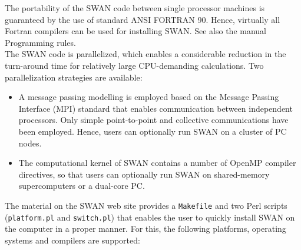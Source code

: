 \documentclass[12pt]{book}
\begin{document}
 \label{ch:instal}

The portability of the SWAN code between single processor machines is guaranteed by the use of standard ANSI
FORTRAN 90. Hence, virtually all Fortran compilers can be used for installing SWAN. See also the manual Programming rules.
\\[2ex]
\noindent
The SWAN code is parallelized, which enables a considerable reduction in the turn-around time for relatively
large CPU-demanding calculations. Two parallelization strategies are available:
\begin{itemize}
  \item A message passing modelling is employed based on the Message Passing Interface (MPI) standard that
        enables communication between independent processors. Only simple point-to-point and collective
        communications have been employed. Hence, users can optionally run SWAN on a cluster of PC nodes.
  \item The computational kernel of SWAN contains a number of OpenMP compiler directives, so that users can
        optionally run SWAN on shared-memory supercomputers or a dual-core PC.
\end{itemize}
\noindent
The material on the SWAN web site provides a {\tt Makefile} and two Perl scripts ({\tt platform.pl}
and {\tt switch.pl}) that enables the user to quickly install SWAN on the computer in a
proper manner. For this, the following platforms, operating systems and compilers are supported:
\newpage
\end{document}
